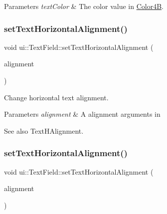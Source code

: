 \begin{DoxyParams}{Parameters}
{\em text\+Color} & The color value in {\ttfamily \hyperlink{structColor4B}{Color4B}}. \\
\hline
\end{DoxyParams}
\mbox{\label{classui_1_1TextField_a5cb293b70c2aa7f8f7c91a9a17376a65}} 
\subsubsection{\texorpdfstring{set\+Text\+Horizontal\+Alignment()}{setTextHorizontalAlignment()}\hspace{0.1cm}{\footnotesize\ttfamily [1/2]}}
{\footnotesize\ttfamily void ui\+::\+Text\+Field\+::set\+Text\+Horizontal\+Alignment (\begin{DoxyParamCaption}\item[{Text\+H\+Alignment}]{alignment }\end{DoxyParamCaption})}



Change horizontal text alignment. 


\begin{DoxyParams}{Parameters}
{\em alignment} & A alignment arguments in \\
\hline
\end{DoxyParams}
\begin{DoxySeeAlso}{See also}
{\ttfamily Text\+H\+Alignment}. 
\end{DoxySeeAlso}
\mbox{\label{classui_1_1TextField_a5cb293b70c2aa7f8f7c91a9a17376a65}} 
\subsubsection{\texorpdfstring{set\+Text\+Horizontal\+Alignment()}{setTextHorizontalAlignment()}\hspace{0.1cm}{\footnotesize\ttfamily [2/2]}}
{\footnotesize\ttfamily void ui\+::\+Text\+Field\+::set\+Text\+Horizontal\+Alignment (\begin{DoxyParamCaption}\item[{Text\+H\+Alignment}]{alignment }\end{DoxyParamCaption})}



